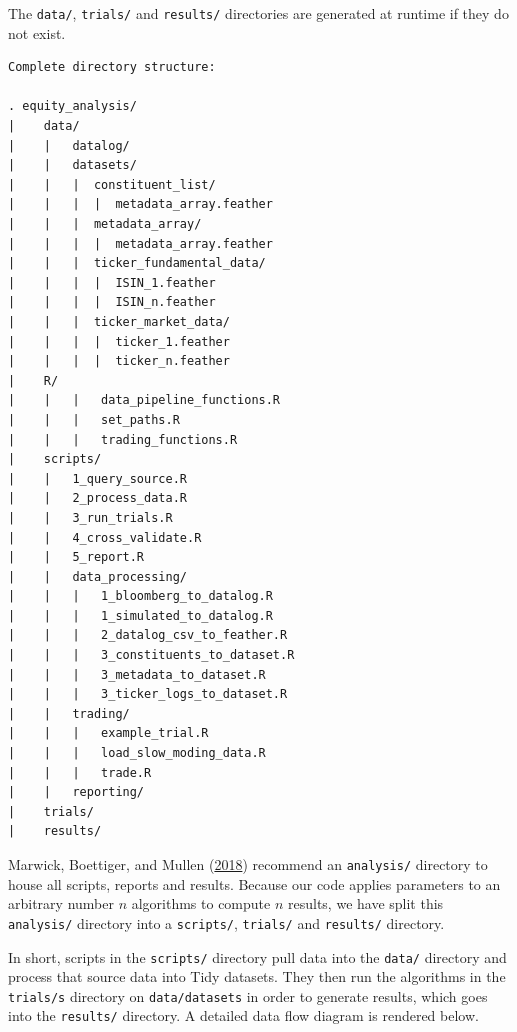\documentclass[11pt,preprint, authoryear]{elsarticle}
\numberwithin{equation}{section}
\numberwithin{figure}{section}
\numberwithin{table}{section}
\begin{document}
The \texttt{data/}, \texttt{trials/} and \texttt{results/} directories
are generated at runtime if they do not exist.

\newpage

\begin{verbatim}
Complete directory structure: 

. equity_analysis/
|    data/
|    |   datalog/
|    |   datasets/
|    |   |  constituent_list/
|    |   |  |  metadata_array.feather
|    |   |  metadata_array/
|    |   |  |  metadata_array.feather
|    |   |  ticker_fundamental_data/
|    |   |  |  ISIN_1.feather
|    |   |  |  ISIN_n.feather
|    |   |  ticker_market_data/
|    |   |  |  ticker_1.feather
|    |   |  |  ticker_n.feather
|    R/
|    |   |   data_pipeline_functions.R
|    |   |   set_paths.R
|    |   |   trading_functions.R
|    scripts/
|    |   1_query_source.R
|    |   2_process_data.R
|    |   3_run_trials.R
|    |   4_cross_validate.R
|    |   5_report.R
|    |   data_processing/
|    |   |   1_bloomberg_to_datalog.R
|    |   |   1_simulated_to_datalog.R
|    |   |   2_datalog_csv_to_feather.R
|    |   |   3_constituents_to_dataset.R
|    |   |   3_metadata_to_dataset.R
|    |   |   3_ticker_logs_to_dataset.R
|    |   trading/
|    |   |   example_trial.R
|    |   |   load_slow_moding_data.R
|    |   |   trade.R
|    |   reporting/
|    trials/
|    results/
\end{verbatim}

Marwick, Boettiger, and Mullen
(\protect\hyperlink{ref-Marwick2018}{2018}) recommend an
\texttt{analysis/} directory to house all scripts, reports and results.
Because our code applies parameters to an arbitrary number \(n\)
algorithms to compute \(n\) results, we have split this
\texttt{analysis/} directory into a \texttt{scripts/}, \texttt{trials/}
and \texttt{results/} directory.

In short, scripts in the \texttt{scripts/} directory pull data into the
\texttt{data/} directory and process that source data into Tidy
datasets. They then run the algorithms in the \texttt{trials/s}
directory on \texttt{data/datasets} in order to generate results, which
goes into the \texttt{results/} directory. A detailed data flow diagram
is rendered below.
\end{document}
